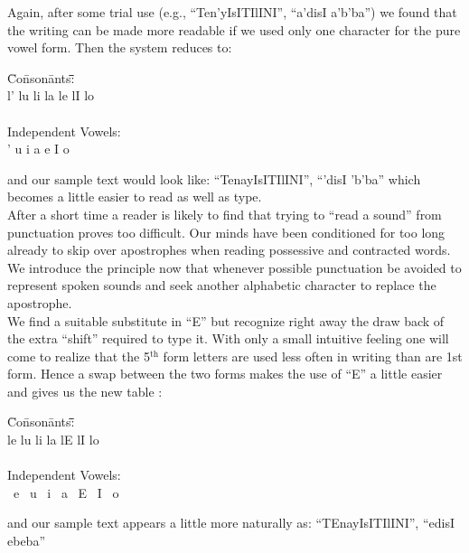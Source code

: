  Again, after some trial use (e.g., ``Ten'yIsITIlINI'', ``a'disI a'b'ba'') we
 found that the writing can be made more readable if we used only one
 character for the pure vowel form.  Then the system reduces to:
 
\begin{tabbing}
\hspace{0.2in}\=Co\=nson\=ants\=:\hspace{0.2in}\= \hspace{0.25in}\= \hspace{0.3in}\=  \hspace{0.25in}\= \\
      \>\>l'   \>lu   \>li   \>la   \>le   \>lI   \>lo \\
 \ \\
      \>Independent Vowels: \\
      \>\>'    \>u    \>i    \>a    \>e    \>I    \>o 
\end{tabbing}
 and our sample text would look like:  ``TenayIsITIlINI'', ``'disI 'b'ba''
 which becomes a little easier to read as well as type. \\
 
 After a short time a reader is likely to find that trying to ``read a sound''
 from punctuation proves too difficult.  Our minds have been conditioned for
 too long already to skip over apostrophes when reading possessive and
 contracted words.  We introduce the principle now that whenever possible
 punctuation be avoided to represent spoken sounds and seek another alphabetic
 character to replace the apostrophe.   \\

 We find a suitable substitute in ``E'' but recognize right away the draw back
 of the extra ``shift'' required to type it.  With only a small intuitive feeling
 one will come to realize that the 5$^{\textrm{th}}$ form letters are used less often in
 writing than are 1st form.  Hence a swap between the two forms makes the use
 of ``E'' a little easier and gives us the new table :
\newpage
\begin{tabbing}
\hspace{0.2in}\=Co\=nson\=ants\=:\hspace{0.2in}\= \hspace{0.25in}\= \hspace{0.3in}\=  \hspace{0.25in}\= \\
     \>\>le   \>lu   \>li   \>la   \>lE   \>lI   \>lo               \\
 \ \\
      \>Independent Vowels: \\
     \>\>\ e    \>\ u    \>\ i    \>\ a    \>\ E    \>\ I    \>\ o  
\end{tabbing}
\noi
 and our sample text appears a little more naturally as:  
     ``TEnayIsITIlINI'', ``edisI ebeba''

